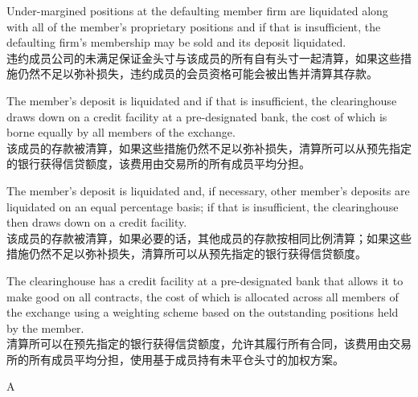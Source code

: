 \documentclass{article}
\begin{document}
\begin{choices}
    \item Under-margined positions at the defaulting member firm are liquidated along with all of the member's proprietary positions and if that is insufficient, the defaulting firm's membership may be sold and its deposit liquidated.\\
    违约成员公司的未满足保证金头寸与该成员的所有自有头寸一起清算，如果这些措施仍然不足以弥补损失，违约成员的会员资格可能会被出售并清算其存款。
    \item The member's deposit is liquidated and if that is insufficient, the clearinghouse draws down on a credit facility at a pre-designated bank, the cost of which is borne equally by all members of the exchange.\\
    该成员的存款被清算，如果这些措施仍然不足以弥补损失，清算所可以从预先指定的银行获得信贷额度，该费用由交易所的所有成员平均分担。
    \item The member's deposit is liquidated and, if necessary, other member's deposits are liquidated on an equal percentage basis; if that is insufficient, the clearinghouse then draws down on a credit facility.\\
    该成员的存款被清算，如果必要的话，其他成员的存款按相同比例清算；如果这些措施仍然不足以弥补损失，清算所可以从预先指定的银行获得信贷额度。
    \item The clearinghouse has a credit facility at a pre-designated bank that allows it to make good on all contracts, the cost of which is allocated across all members of the exchange using a weighting scheme based on the outstanding positions held by the member.\\
    清算所可以在预先指定的银行获得信贷额度，允许其履行所有合同，该费用由交易所的所有成员平均分担，使用基于成员持有未平仓头寸的加权方案。
\end{choices}

\begin{correctanswer}
    A
\end{correctanswer}
\end{document}
